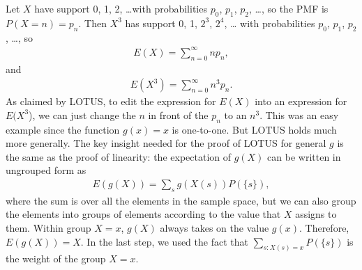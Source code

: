 Let \(X\) have support 0, 1, 2, \ldots with probabilities \(p_{0}\),
\(p_{1}\), \(p_{2}\), \ldots, so the PMF is \(P(X = n) = p_{n}\). 
Then \(X^{3}\) has support 0, 1, \(2^{3}\), \(2^{4}\), \ldots{} with
probabilities \(p_{0}\), \(p_{1}\), \(p_{2}\), \ldots, so
\begin{align}
E(X) = \sum_{n = 0}^{\infty}{np_{n}},
\end{align}
and
\begin{align}
E\left(X^{3}\right) = \sum_{n = 0}^{\infty}{n^{3}p_{n}}.
\end{align}
As claimed by LOTUS, 
to edit the expression for \(E(X)\) into an expression for \(E(X^{3}\)), 
we can just change the \(n\) in front of the \(p_{n}\) to an \(n^{3}\). 
This was an easy example since the function \(g(x) = x\) is one-to-one. 
But LOTUS holds much more generally. 
The key insight needed for the proof of LOTUS for general
\(g\) is the same as the proof of linearity: the expectation of \(g(X)\)
can be written in ungrouped form as
\begin{align}
E(g(X)) = \sum_{s}{g(X(s))P(\{ s\})},
\end{align}
where the sum is over all the elements in the sample space, 
but we can also group the elements into groups of elements according to the value
that \(X\) assigns to them. 
Within group \(X = x\), 
\(g(X)\) always takes on the value \(g(x)\). 
Therefore, \(E(g(X)) = X\).
In the last step, we used the fact that
\(\sum_{s:X(s) = x}{P\left(\{s\} \right)}\) is the
weight of the group \(X = x\).


